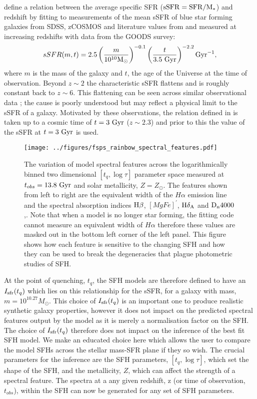 \documentclass[useAMS,usenatbib]{mn2e}
\begin{document}
\citet[][Equation 1]{peng10} define a relation between the average specific SFR ($\rm{sSFR}=SFR/M_*$) and redshift by fitting to measurements of the mean sSFR of blue star forming galaxies from SDSS, zCOSMOS and literature values from \cite{elbaz07} and \cite{daddi07} measured at increasing redshifts with data from the GOODS survey:
\begin{equation}\label{eq:peng}
sSFR(m,t) = 2.5 \left( \frac{m}{10^{10} \rm{M}_{\odot}} \right)^{-0.1} \left(\frac{t}{3.5 ~\rm{Gyr}}\right)^{-2.2} \rm{Gyr}^{-1},
\end{equation}
where $m$ is the mass of the galaxy and $t$, the age of the Universe at the time of observation. Beyond $z \sim 2$ the characteristic sSFR flattens and is roughly constant back to $z\sim6$. This flattening can be seen across similar observational data \citep{peng10, gonzalez10, bethermin12}; the cause is poorly understood but may reflect a physical limit to the sSFR of a galaxy. Motivated by these observations, the relation defined in \citet{peng10} is taken up to a cosmic time of $t=3~\rm{Gyr}$ ($z \sim 2.3$) and prior to this the value of the sSFR at $t=3~\rm{Gyr}$ is used. 

\begin{figure*}
\centering
\texttt{[image: ../figures/fsps\_rainbow\_spectral\_features.pdf]}
\caption{The variation of model spectral features across the logarithmically binned two dimensional $[t_q, \log \tau]$ parameter space measured at $t_{obs}=13.8~\rm{Gyr}$ and solar metallicity, $Z=Z_{\odot}$. The features shown from left to right are the equivalent width of the $H\alpha$ emission line and the spectral absorption indices $\rm{H}\beta$, $[MgFe]^{\prime}$, $\rm{H}\delta_A$ and $\rm{D}_n4000$,. Note that when a model is no longer star forming, the fitting code cannot measure an equivalent width of $H\alpha$ therefore these values are masked out in the bottom left corner of the left panel. This figure shows how each feature is sensitive to the changing SFH and how they can be used to break the degeneracies that plague photometric studies of SFH. }
\label{fig:rainbow}
\end{figure*}

At the point of quenching, $t_{q}$, the SFH models are therefore defined to have an $I_{\rm{sfr}}(t_q)$ which lies on this relationship for the sSFR, for a galaxy with mass, $m = 10^{10.27} M_{\odot}$. This choice of $I_{\rm{sfr}}(t_q)$ is an important one to produce realistic synthetic galaxy properties, however it does not impact on the predicted spectral features output by the model as it is merely a normalisation factor on the SFH. The choice of $I_{\rm{sfr}}(t_q)$ therefore does not impact on the inference of the best fit SFH model. We make an educated choice here which allows the user to compare the model SFHs across the stellar mass-SFR plane if they so wish. The crucial parameters for the inference are the SFH parameters, $[t_q, \log \tau]$, which set the shape of the SFH, and the metallicity, $Z$, which can affect the strength of a spectral feature. The spectra at a any given redshift, z (or time of observation, $t_{obs}$), within the SFH can now be generated for any set of SFH parameters.
\end{document}

